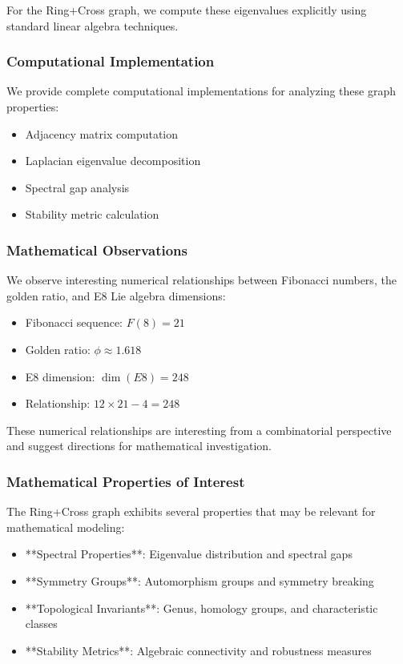 \documentclass[12pt,a4paper]{article}
\begin{document}
For the Ring+Cross graph, we compute these eigenvalues explicitly using standard linear algebra techniques.

\subsubsection{Computational Implementation}
We provide complete computational implementations for analyzing these graph properties:

\begin{itemize}
\item Adjacency matrix computation
\item Laplacian eigenvalue decomposition
\item Spectral gap analysis
\item Stability metric calculation
\end{itemize}

\subsubsection{Mathematical Observations}
We observe interesting numerical relationships between Fibonacci numbers, the golden ratio, and E8 Lie algebra dimensions:

\begin{itemize}
\item Fibonacci sequence: $F(8) = 21$
\item Golden ratio: $\phi \approx 1.618$
\item E8 dimension: $\dim(E8) = 248$
\item Relationship: $12 \times 21 - 4 = 248$
\end{itemize}

These numerical relationships are interesting from a combinatorial perspective and suggest directions for mathematical investigation.

\subsubsection{Mathematical Properties of Interest}
The Ring+Cross graph exhibits several properties that may be relevant for mathematical modeling:

\begin{itemize}
\item **Spectral Properties**: Eigenvalue distribution and spectral gaps
\item **Symmetry Groups**: Automorphism groups and symmetry breaking
\item **Topological Invariants**: Genus, homology groups, and characteristic classes
\item **Stability Metrics**: Algebraic connectivity and robustness measures
\end{itemize}
\end{document}

